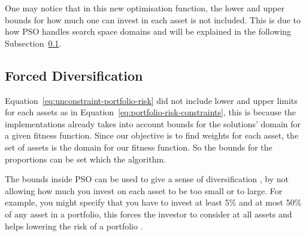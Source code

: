 \documentclass{pdfmx4020}
\begin{document}
    One may notice that in this new optimisation function, the lower and upper bounds for how much one can invest in each asset is not included. This is due to how PSO handles search space domains and will be explained in the following Subsection~\ref{sub:forced_diversification}.
    \subsection{Forced Diversification} %
    \label{sub:forced_diversification}
    Equation~\ref{eq:unconstraint-portfolio-risk} did not include lower and upper limits for each assets as in Equation~\ref{eq:portfolio-risk-constraints}, this is because the implementations \cite{haskellPSO} already takes into account bounds for the solutions' domain for a given fitness function. Since our objective is to find weights for each asset, the set of assets is the domain for our fitness function. So the bounds for the proportions can be set which the algorithm.

    The bounds inside PSO can be used to give a sense of diversification \cite{diversification}, by not allowing how much you invest on each asset to be too small or to large. For example, you might specify that you have to invest at least 5\% and at most 50\% of any asset in a portfolio, this forces the investor to consider at all assets and helps lowering the risk of a portfolio \cite{diversification}.
    
\end{document}
